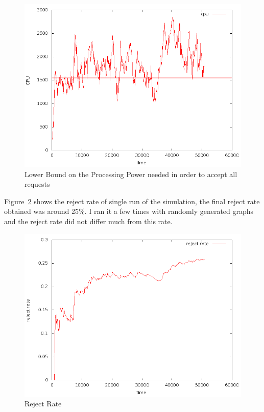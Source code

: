 \documentclass[11pt, a4paper]{article}
\begin{document}
\begin{figure}[h]
  \centering
  \includegraphics[scale=0.35]{cpu.png}
  \caption{Lower Bound on the Processing Power needed in order to accept all requests}\label{cpu}
\end{figure}

Figure~\ref{reject} shows the reject rate of single run of the simulation, the final reject rate obtained was around 25\%. I ran it a few times with randomly generated graphs and the reject rate did not differ much from this rate.

\begin{figure}[h]
  \centering
  \includegraphics[scale=0.35]{rejectrate.png}
  \caption{Reject Rate}\label{reject}
\end{figure}
\end{document}
